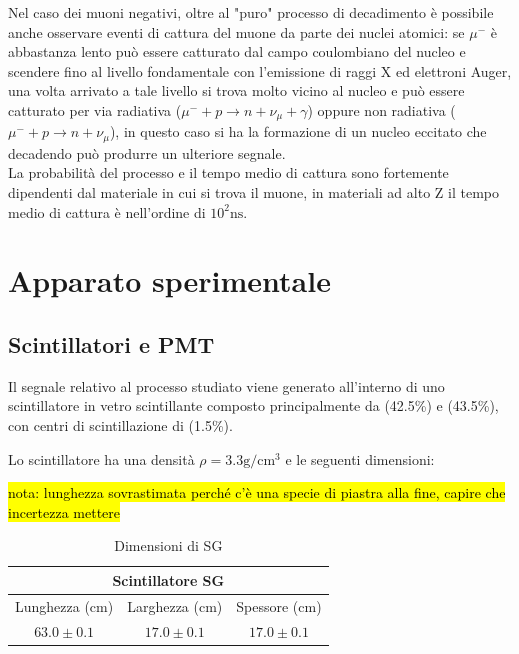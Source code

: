 \documentclass[a4paper, 11pt]{article}
\begin{document}
    Nel caso dei muoni negativi, oltre al "puro" processo di decadimento è possibile anche osservare eventi di cattura del muone da parte dei nuclei atomici: se $\mu^-$ è abbastanza lento può essere catturato dal campo coulombiano del nucleo e scendere fino al livello fondamentale con l'emissione di raggi X ed elettroni Auger, una volta arrivato a tale livello si trova molto vicino al nucleo e può essere catturato per via radiativa ($\mu^-+p\to n+\nu_\mu+\gamma$) oppure non radiativa ($\mu^-+p\to n+\nu_\mu$), in questo caso si ha la formazione di un nucleo eccitato che decadendo può produrre un ulteriore segnale.
    \\
    La probabilità del processo e il tempo medio di cattura sono fortemente dipendenti dal materiale in cui si trova il muone, in materiali ad alto Z il tempo medio di cattura è nell'ordine di $10^2\unit{\nano\second}$.

\section{Apparato sperimentale}

    \subsection{Scintillatori e PMT}
    
        Il segnale relativo al processo studiato viene generato all'interno di uno scintillatore in vetro scintillante composto principalmente da  (42.5\%) e  (43.5\%), con centri di scintillazione di  (1.5\%).
        
        Lo scintillatore ha una densità $\rho=3.3\unit{\gram\per\centi\metre\cubed}$ e le seguenti dimensioni:

        \hl{nota: lunghezza sovrastimata perché c'è una specie di piastra alla fine, capire che incertezza mettere}
        
        \begin{table}[H]
            \centering
            \begin{tabular}{|c|c|c|}
            \toprule
            \multicolumn{3}{|c|}{\textbf{Scintillatore SG}} \\
            \midrule
            Lunghezza (\unit{\centi\metre}) & Larghezza (\unit{\centi\metre}) & Spessore (\unit{\centi\metre})\\
            \midrule
            $63.0\pm0.1$ & $17.0\pm0.1$ & $17.0\pm0.1$\\
            \bottomrule
            \end{tabular}
            \caption{Dimensioni di SG}
            \label{t:SG_dimensioni}
        \end{table}
\end{document}
